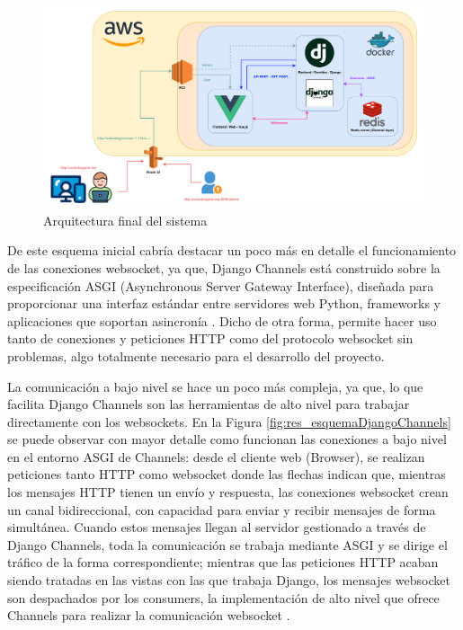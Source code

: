 \begin{figure}[ht!]
	\centering
	\includegraphics[width=\textwidth,clip=true]{res_arquitecturaSoftware.pdf}
	\caption{Arquitectura final del sistema}
	\label{fig:res_arquitecturaSoftware}
\end{figure}

De este esquema inicial cabría destacar un poco más en detalle el funcionamiento de las conexiones websocket, ya que, Django Channels 
está construido sobre la especificación ASGI (Asynchronous Server Gateway Interface), diseñada para proporcionar una interfaz estándar entre servidores web Python, frameworks y aplicaciones que soportan asincronía \cite{ASGI}. Dicho de otra forma,
permite hacer uso tanto de conexiones y peticiones HTTP como del protocolo websocket sin problemas, algo totalmente necesario para el desarrollo del proyecto. 

La comunicación a bajo nivel se hace un poco más compleja, ya que, lo que facilita Django Channels son las herramientas de alto
nivel para trabajar directamente con los websockets. En la Figura \ref{fig:res_esquemaDjangoChannels} se puede observar con mayor detalle como funcionan
las conexiones a bajo nivel en el entorno ASGI de Channels: desde el cliente web (Browser), se realizan peticiones
tanto HTTP como websocket donde las flechas indican que, mientras los mensajes HTTP tienen un envío y respuesta, las conexiones websocket crean 
un canal bidireccional, con capacidad para enviar y recibir mensajes de forma simultánea. Cuando estos mensajes llegan al servidor gestionado
a través de Django Channels, toda la comunicación se trabaja mediante ASGI y se dirige el tráfico de la forma correspondiente; mientras que las peticiones HTTP
acaban siendo tratadas en las vistas con las que trabaja Django, los mensajes websocket son despachados por los consumers, la implementación de 
alto nivel que ofrece Channels para realizar la comunicación websocket \cite{websocketMDN} \cite{whatIsDjangoChannels}.

